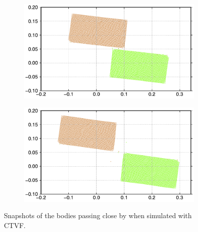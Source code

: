 \begin{figure}[!htpb]
  \begin{subfigure}{0.48\textwidth}
    \centering
    \includegraphics[width=1.0\textwidth]{figures/csph/figures/dinesh_2022_elastic_solids_passing_by/CTVF/time2}
    \label{fig:passing-2}
  \end{subfigure}
  \begin{subfigure}{0.48\textwidth}
    \centering
    \includegraphics[width=1.0\textwidth]{figures/csph/figures/dinesh_2022_elastic_solids_passing_by/CTVF/time3}
    \label{fig:passing-3}
  \end{subfigure}
  \caption{Snapshots of the bodies passing close by when simulated with CTVF.}
  \label{fig:dinesh-2022-passing-ctvf}
\end{figure}
%

